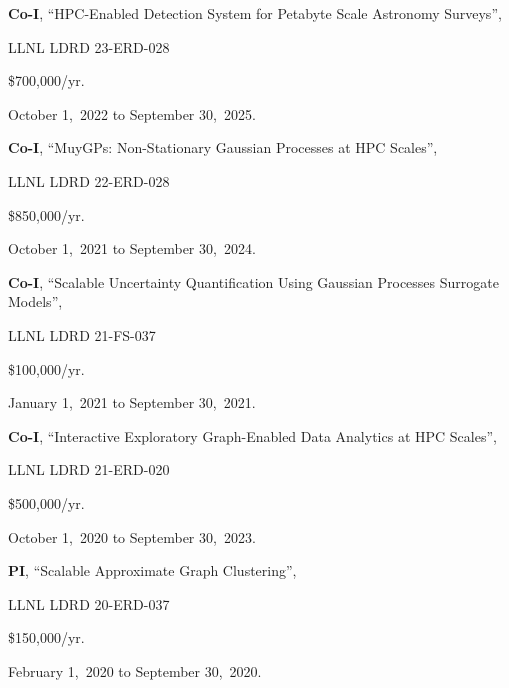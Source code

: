 \begin{innerlist}
  \item[] \textbf{Co-I},
  ``HPC-Enabled Detection System for Petabyte Scale Astronomy Surveys'',
  \begin{innerlist}
    \item[-] LLNL LDRD 23-ERD-028
    \item[-] \$700,000/yr.
    \item[-] October 1,~2022 to September 30,~2025.
  \end{innerlist}

  \item[] \textbf{Co-I},
  ``MuyGPs: Non-Stationary Gaussian Processes at HPC Scales'',
  \begin{innerlist}
    \item[-] LLNL LDRD 22-ERD-028
    \item[-] \$850,000/yr.
    \item[-] October 1,~2021 to September 30,~2024.
  \end{innerlist}

  \item[] \textbf{Co-I},
  ``Scalable Uncertainty Quantification Using Gaussian Processes Surrogate Models'',
  \begin{innerlist}
    \item[-] LLNL LDRD 21-FS-037
    \item[-] \$100,000/yr.
    \item[-] January 1,~2021 to September 30,~2021.
  \end{innerlist}

  \item[] \textbf{Co-I},
  ``Interactive Exploratory Graph-Enabled Data Analytics at HPC Scales'',
  \begin{innerlist}
    \item[-] LLNL LDRD 21-ERD-020
    \item[-] \$500,000/yr.
    \item[-] October 1,~2020 to September 30,~2023.
  \end{innerlist}

  \item[] \textbf{PI},
  ``Scalable Approximate Graph Clustering'',
  \begin{innerlist}
    \item[-] LLNL LDRD 20-ERD-037
    \item[-] \$150,000/yr.
    \item[-] February 1,~2020 to September 30,~2020.
  \end{innerlist}

\end{innerlist}
